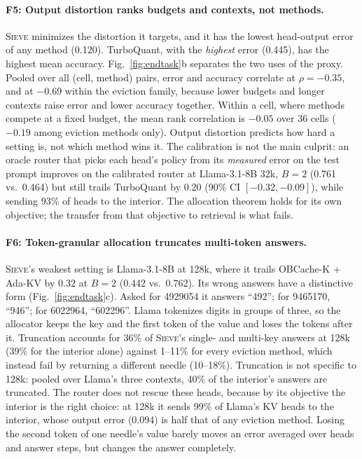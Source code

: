 \documentclass{article}
\newcommand{\sieve}{\textsc{Sieve}}
\theoremstyle{definition}
\begin{document}
\paragraph{F5: Output distortion ranks budgets and contexts, not methods.}
\sieve{} minimizes the distortion it targets, and it has the lowest head-output error of any method (0.120).  TurboQuant, with the \emph{highest} error (0.445), has the highest mean accuracy.  Fig.~\ref{fig:endtask}b separates the two uses of the proxy.  Pooled over all (cell, method) pairs, error and accuracy correlate at $\rho=-0.35$, and at $-0.69$ within the eviction family, because lower budgets and longer contexts raise error and lower accuracy together.  Within a cell, where methods compete at a fixed budget, the mean rank correlation is $-0.05$ over 36 cells ($-0.19$ among eviction methods only).  Output distortion predicts how hard a setting is, not which method wins it.  The calibration is not the main culprit: an oracle router that picks each head's policy from its \emph{measured} error on the test prompt improves on the calibrated router at Llama-3.1-8B 32k, $B=2$ (0.761 vs.\ 0.464) but still trails TurboQuant by 0.20 (90\% CI $[-0.32,-0.09]$), while sending 93\% of heads to the interior.  The allocation theorem holds for its own objective; the transfer from that objective to retrieval is what fails.

\paragraph{F6: Token-granular allocation truncates multi-token answers.}
\sieve{}'s weakest setting is Llama-3.1-8B at 128k, where it trails OBCache-K + Ada-KV by $0.32$ at $B=2$ (0.442 vs.\ 0.762).  Its wrong answers have a distinctive form (Fig.~\ref{fig:endtask}c).  Asked for 4929054 it answers ``492''; for 9465170, ``946''; for 6022964, ``602296''.  Llama tokenizes digits in groups of three, so the allocator keeps the key and the first token of the value and loses the tokens after it.  Truncation accounts for 36\% of \sieve{}'s single- and multi-key answers at 128k (39\% for the interior alone) against 1--11\% for every eviction method, which instead fail by returning a different needle (10--18\%).  Truncation is not specific to 128k: pooled over Llama's three contexts, 40\% of the interior's answers are truncated.  The router does not rescue these heads, because by its objective the interior is the right choice: at 128k it sends 99\% of Llama's KV heads to the interior, whose output error (0.094) is half that of any eviction method.  Losing the second token of one needle's value barely moves an error averaged over heads and answer steps, but changes the answer completely.
\end{document}
